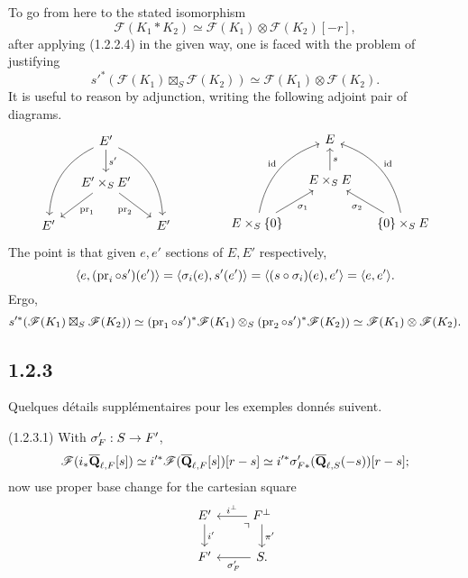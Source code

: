 \documentclass[deligne.tex]{subfiles}
\begin{document}
To go from here to the stated isomorphism
\begin{equation*}
	\mathscr F(K_1*K_2)\simeq\mathscr F(K_1)\otimes\mathscr F(K_2)[-r],
\end{equation*}
after applying (1.2.2.4) in the given way, one is faced with the problem of
justifying
\begin{equation*}
	s'^*(\mathscr F(K_1)\boxtimes_S\mathscr F(K_2))
	\simeq\mathscr F(K_1)\otimes\mathscr F(K_2).
\end{equation*}
It is useful to reason by adjunction, writing the following adjoint pair of
diagrams.
\begin{equation*}\begin{tikzcd}[column sep=small]
	&E'\arrow[d,"{s'}"]\arrow[ddl,bend right]\arrow[ddr,bend left] \\
	&E'\times_SE'\arrow[dl,"\pr_1"]\arrow[dr,"\pr_2"'] \\
	E'&&E'
\end{tikzcd}\qquad\qquad\begin{tikzcd}[column sep=small]
	&E \\
	&E\times_SE\arrow[u,"s"'] \\
	E\times_S\{0\}\arrow[uur,bend left,"\id"]\arrow[ur,"\sigma_1"']&&\{0\}\times_SE\arrow[uul,bend right,"\id"']\arrow[ul,"\sigma_2"]
\end{tikzcd}\end{equation*}
The point is that given $e,e'$ sections of $E,E'$ respectively,
\begin{equation*}
	\langle e,(\operatorname{pr}_i\circ s')(e')\rangle
	=\langle \sigma_i(e),s'(e') \rangle
	=\langle (s\circ \sigma_i)(e), e'\rangle
	=\langle e,e'\rangle.
\end{equation*}
Ergo,
\begin{equation*}
	s'^*(\mathscr F(K_1)\boxtimes_S\mathscr F(K_2))
	\simeq(\operatorname{pr}_1\circ s')^*\mathscr F(K_1)\otimes_S(\operatorname{pr}_2\circ s')^*\mathscr F(K_2))
	\simeq\mathscr F(K_1)\otimes\mathscr F(K_2).
\end{equation*}

\subsection*{1.2.3} Quelques détails supplémentaires pour les exemples donnés suivent.

(1.2.3.1) With $\sigma'_F:S\rightarrow F'$,
\begin{equation*}
	\mathscr F(i_*\overline{\mathbf{Q}}_{\ell,F}[s])
	\simeq i'^*\mathscr F(\overline{\mathbf{Q}}_{\ell,F}[s])[r-s]
	\simeq i'^*\sigma_{F*}'(\overline{\mathbf{Q}}_{\ell,S}(-s))[r-s];
\end{equation*}
now use proper base change for the cartesian square
\begin{equation*}\begin{tikzcd}
	E'\arrow[d,"{i'}"]&F^\perp\arrow[l,"i^\perp"']\arrow[d,"\pi'"]\arrow[dl,phantom,"\urcorner",very near start] \\
	F'&S\arrow[l,"\sigma_F'"].
\end{tikzcd}\end{equation*}
\end{document}
